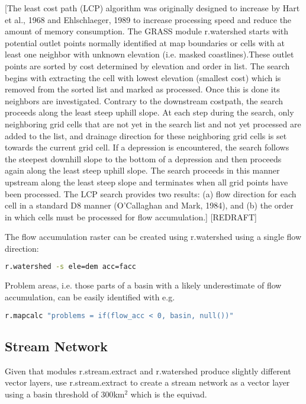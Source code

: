 [The least cost path (LCP) algorithm was originally designed to increase by  Hart et al., 1968 and Ehlschlaeger, 1989 to increase processing speed and reduce the amount of memory consumption. The GRASS module r.watershed starts with potential outlet points normally identified at map boundaries or cells with at least one neighbor with unknown elevation (i.e. masked coastlines).These outlet points are sorted by cost determined by elevation and order in list. The search begins with extracting the cell with lowest elevation (smallest cost) which is removed from the sorted list and marked as processed. Once this is done its neighbors are investigated. Contrary to the downstream costpath, the search proceeds along the least steep uphill slope. At each step during the search, only neighboring
grid cells that are not yet in the search list and not yet processed are added to the list, and drainage direction for these neighboring grid cells is set towards the current grid cell. If a depression is encountered, the search follows the steepest downhill slope to the bottom of a depression and then proceeds again along the least steep uphill slope. The search proceeds in this manner upstream along the least steep slope and terminates when all grid points have been processed. The LCP search provides two results: (a) flow direction for each
cell in a standard D8 manner (O’Callaghan and Mark, 1984), and (b) the order in which cells must be processed for flow accumulation.] [REDRAFT]

The flow accumulation raster can be created using r.watershed using a single flow direction:

\begin{lstlisting}[language=bash]
r.watershed -s ele=dem acc=facc 
\end{lstlisting} 

Problem areas, i.e. those parts of a basin with a likely underestimate of flow accumulation, can be easily identified with e.g.

\begin{lstlisting}[language=bash]
r.mapcalc "problems = if(flow_acc < 0, basin, null())" 
\end{lstlisting} 

\subsection{Stream Network}

Given that modules r.stream.extract and r.watershed produce slightly different vector layers, use r.stream.extract to create a stream network as a vector layer using a basin threshold of 300km${^2}$ which is the equivad.
 
